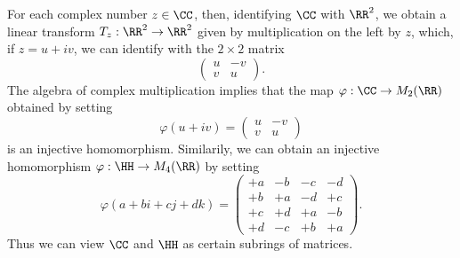 \begin{example}
    For each complex number $z \in \CC$, then, identifying $\CC$ with $\RR^2$, we obtain a linear transform $T_z: \RR^2 \to \RR^2$ given by multiplication on the left by $z$, which, if $z = u + iv$, we can identify with the $2 \times 2$ matrix
    \[ \begin{pmatrix} u & -v \\ v & u \end{pmatrix}. \]
    The algebra of complex multiplication implies that the map $\varphi: \CC \to M_2(\RR)$ obtained by setting
    \[ \varphi(u + iv) = \begin{pmatrix} u & -v \\ v & u \end{pmatrix} \]
    is an injective homomorphism. Similarily, we can obtain an injective homomorphism $\varphi: \HH \to M_4(\RR)$ by setting
    \[ \varphi(a + bi + cj + dk) = \begin{pmatrix} +a & -b & -c & -d \\ +b & +a & -d & +c \\ +c & +d & +a & -b \\ +d & -c & +b & +a \end{pmatrix}. \]
    Thus we can view $\CC$ and $\HH$ as certain subrings of matrices.


\end{example}
